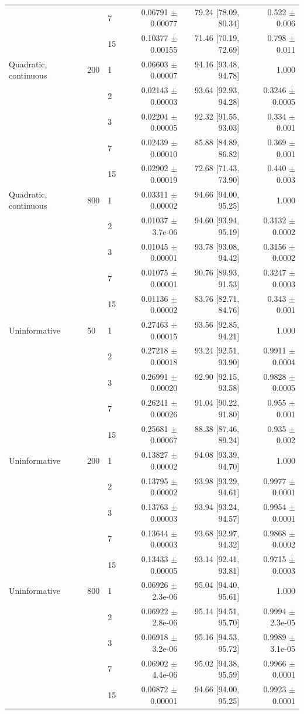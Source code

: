 \begin{longtable}{lllrrr}
 &  & 7 & 0.06791 $\pm$ 0.00077 & 79.24 [78.09, 80.34] & 0.522 $\pm$ 0.006 \\
 &  & 15 & 0.10377 $\pm$ 0.00155 & 71.46 [70.19, 72.69] & 0.798 $\pm$ 0.011 \\
Quadratic, continuous & 200 & 1 & 0.06603 $\pm$ 0.00007 & 94.16 [93.48, 94.78] & 1.000 \\
 &  & 2 & 0.02143 $\pm$ 0.00003 & 93.64 [92.93, 94.28] & 0.3246 $\pm$ 0.0005 \\
 &  & 3 & 0.02204 $\pm$ 0.00005 & 92.32 [91.55, 93.03] & 0.334 $\pm$ 0.001 \\
 &  & 7 & 0.02439 $\pm$ 0.00010 & 85.88 [84.89, 86.82] & 0.369 $\pm$ 0.001 \\
 &  & 15 & 0.02902 $\pm$ 0.00019 & 72.68 [71.43, 73.90] & 0.440 $\pm$ 0.003 \\
Quadratic, continuous & 800 & 1 & 0.03311 $\pm$ 0.00002 & 94.66 [94.00, 95.25] & 1.000 \\
 &  & 2 & 0.01037 $\pm$ 3.7e-06 & 94.60 [93.94, 95.19] & 0.3132 $\pm$ 0.0002 \\
 &  & 3 & 0.01045 $\pm$ 0.00001 & 93.78 [93.08, 94.42] & 0.3156 $\pm$ 0.0002 \\
 &  & 7 & 0.01075 $\pm$ 0.00001 & 90.76 [89.93, 91.53] & 0.3247 $\pm$ 0.0003 \\
 &  & 15 & 0.01136 $\pm$ 0.00002 & 83.76 [82.71, 84.76] & 0.343 $\pm$ 0.001 \\
Uninformative & 50 & 1 & 0.27463 $\pm$ 0.00015 & 93.56 [92.85, 94.21] & 1.000 \\
 &  & 2 & 0.27218 $\pm$ 0.00018 & 93.24 [92.51, 93.90] & 0.9911 $\pm$ 0.0004 \\
 &  & 3 & 0.26991 $\pm$ 0.00020 & 92.90 [92.15, 93.58] & 0.9828 $\pm$ 0.0005 \\
 &  & 7 & 0.26241 $\pm$ 0.00026 & 91.04 [90.22, 91.80] & 0.955 $\pm$ 0.001 \\
 &  & 15 & 0.25681 $\pm$ 0.00067 & 88.38 [87.46, 89.24] & 0.935 $\pm$ 0.002 \\
Uninformative & 200 & 1 & 0.13827 $\pm$ 0.00002 & 94.08 [93.39, 94.70] & 1.000 \\
 &  & 2 & 0.13795 $\pm$ 0.00002 & 93.98 [93.29, 94.61] & 0.9977 $\pm$ 0.0001 \\
 &  & 3 & 0.13763 $\pm$ 0.00003 & 93.94 [93.24, 94.57] & 0.9954 $\pm$ 0.0001 \\
 &  & 7 & 0.13644 $\pm$ 0.00003 & 93.68 [92.97, 94.32] & 0.9868 $\pm$ 0.0002 \\
 &  & 15 & 0.13433 $\pm$ 0.00005 & 93.14 [92.41, 93.81] & 0.9715 $\pm$ 0.0003 \\
Uninformative & 800 & 1 & 0.06926 $\pm$ 2.3e-06 & 95.04 [94.40, 95.61] & 1.000 \\
 &  & 2 & 0.06922 $\pm$ 2.8e-06 & 95.14 [94.51, 95.70] & 0.9994 $\pm$ 2.3e-05 \\
 &  & 3 & 0.06918 $\pm$ 3.2e-06 & 95.16 [94.53, 95.72] & 0.9989 $\pm$ 3.1e-05 \\
 &  & 7 & 0.06902 $\pm$ 4.4e-06 & 95.02 [94.38, 95.59] & 0.9966 $\pm$ 0.0001 \\
 &  & 15 & 0.06872 $\pm$ 0.00001 & 94.66 [94.00, 95.25] & 0.9923 $\pm$ 0.0001 \\
\bottomrule
\end{longtable}
\endgroup
